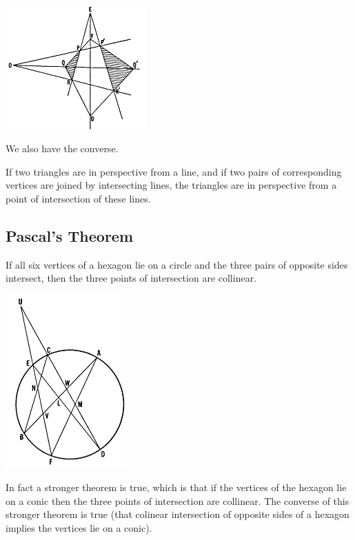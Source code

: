 \documentclass[DIV=12, a4]{scrartcl}
\begin{document}
 \begin{center}
		\includegraphics[width=0.4\textwidth]{media/3-6A}
\end{center}

We also have the converse.

\begin{theorem}
	If two triangles are in perspective from a line, and if two pairs of corresponding vertices are joined by intersecting lines, the triangles are in perspective from a point of intersection of these lines.
\end{theorem}

\subsection{Pascal's Theorem}


\begin{theorem}
If all six vertices of a hexagon lie on a circle and the three pairs of opposite sides intersect, then the three points of intersection are collinear.
\end{theorem}

 \begin{center}
		\includegraphics[width=0.35\textwidth]{media/3-8A}
\end{center}

In fact a stronger theorem is true, which is that if the vertices of the hexagon lie on a conic then the three points of intersection are collinear. The converse of this stronger theorem is true (that colinear intersection of opposite sides of a hexagon implies the vertices lie on a conic).
\end{document}
